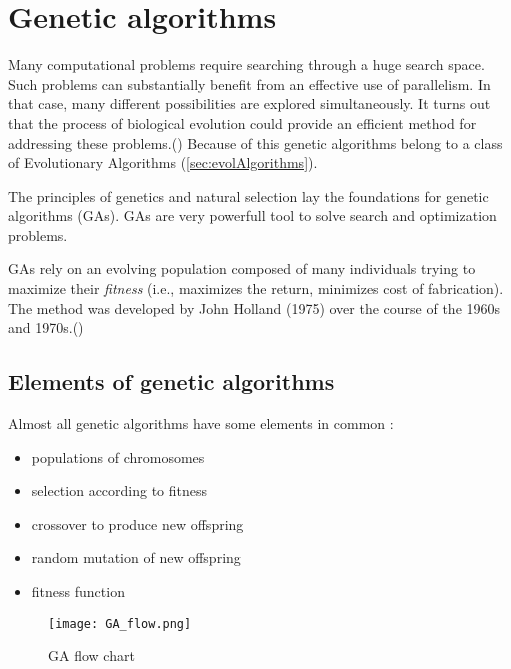 
\section{Genetic algorithms}
\label{sec:genAlgorithms}

Many computational problems require searching through a huge search space.
Such problems can substantially benefit from an effective use of parallelism.
In that case, many different possibilities are explored simultaneously. 
It turns out that the process of biological evolution could provide an efficient method for addressing these problems.(\cite{Mitchell01})
Because of this genetic algorithms belong to a class of Evolutionary Algorithms (\ref{sec:evolAlgorithms}).


The principles of genetics and natural selection lay the foundations for genetic algorithms (GAs).
GAs are very powerfull tool to solve search and optimization problems.

GAs rely on an evolving population composed of many individuals trying to maximize their \emph{fitness} (i.e., maximizes the return, minimizes cost of fabrication).  
The method was developed by John Holland (1975) over the course of the 1960s and 1970s.(\cite{Haupt:2004:PGA:1007746})

\subsection{Elements of genetic algorithms}

Almost all genetic algorithms have some elements in common \cite{Mitchell01}:
\begin{itemize}
  \item populations of chromosomes
  \item selection according to fitness
  \item crossover to produce new offspring
  \item random mutation of new offspring
  \item fitness function
\end{itemize}

\begin{figure}[ht]
  \begin{center}
    \texttt{[image: GA\_flow.png]}
  \end{center}
  \caption{GA flow chart \cite{Haupt:2004:PGA:1007746}}
\end{figure}

